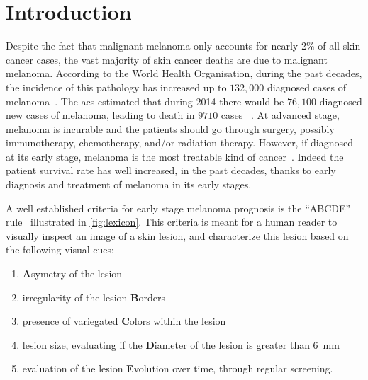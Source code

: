 \graphicspath{ {./content/intro/figures/} }

\section{Introduction}
\label{sec:descr}  %
Despite the fact that malignant melanoma only accounts for nearly 2\% of all skin cancer cases, the vast majority of skin cancer deaths are due to malignant melanoma.
According to the World Health Organisation, during the past decades, the incidence of this pathology has increased up to $132,000$ diagnosed cases of melanoma~\cite{WoH}.
The \Ac{acs} estimated that during 2014 there would be $76,100$ diagnosed new cases of melanoma, leading to death in $9710$ cases  ~\cite{CancerFactsFigures2014}.
At advanced stage, melanoma is incurable and the patients should go through surgery, possibly immunotherapy, chemotherapy, and/or radiation therapy.
However, if diagnosed at its early stage, melanoma is the most treatable kind of cancer~\cite{CancerFactsFigures2014,forsea2012melanoma}.
Indeed the patient survival rate has well increased, in the past decades, thanks to early diagnosis and treatment of melanoma in its early stages.

A well established criteria for early stage melanoma prognosis is the ``ABCDE'' rule~\cite{abbasi2004early} illustrated in \cref{fig:lexicon}.
This criteria is meant for a human reader to visually inspect an image of a skin lesion, and characterize this lesion based on the following visual cues:
\begin{enumerate}[label=(\Alph*)]
\item {\textbf A}symetry of the lesion
\item irregularity of the lesion {\textbf B}orders
\item presence of variegated {\textbf C}olors within the lesion
\item lesion size, evaluating if the {\textbf D}iameter of the lesion is greater than \SI{6}{\milli \meter}
\item evaluation of the lesion {\textbf E}volution over time, through regular screening.
\end{enumerate}

